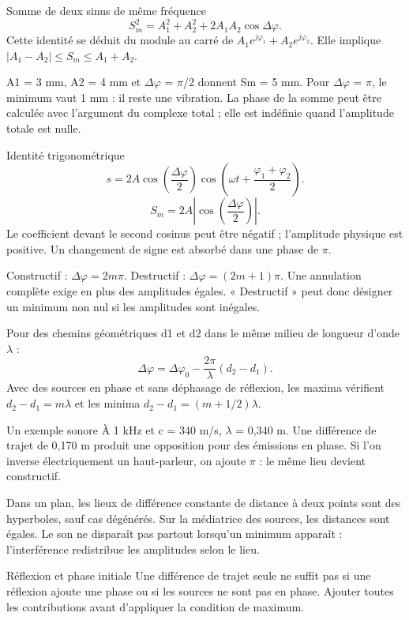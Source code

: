 \begin{loi}{Somme de deux sinus de même fréquence}
\[S_m^2=A_1^2+A_2^2+2A_1A_2\cos\Delta\varphi.\]Cette identité se déduit du module au carré de $A_1e^{j\varphi_1}+A_2e^{j\varphi_2}$. Elle implique $|A_1-A_2|\leq S_m\leq A_1+A_2$.
\end{loi}
A1 = 3 mm, A2 = 4 mm et \ensuremath{\Delta}\ensuremath{\varphi} = \ensuremath{\pi}/2 donnent Sm = 5 mm. Pour \ensuremath{\Delta}\ensuremath{\varphi} = \ensuremath{\pi}, le minimum vaut 1 mm : il reste une vibration. La phase de la somme peut être calculée avec l’argument du complexe total ; elle est indéfinie quand l’amplitude totale est nulle.


\begin{loi}{Identité trigonométrique}
\[s=2A\cos\left(\frac{\Delta\varphi}{2}\right)\cos\left(\omega t+\frac{\varphi_1+\varphi_2}{2}\right).\]\[S_m=2A\left|\cos\left(\frac{\Delta\varphi}{2}\right)\right|.\]Le coefficient devant le second cosinus peut être négatif ; l’amplitude physique est positive. Un changement de signe est absorbé dans une phase de \ensuremath{\pi}.
\end{loi}
Constructif : $\Delta\varphi=2m\pi$. Destructif : $\Delta\varphi=(2m+1)\pi$. Une annulation complète exige en plus des amplitudes égales. « Destructif » peut donc désigner un minimum non nul si les amplitudes sont inégales.


Pour des chemins géométriques d1 et d2 dans le même milieu de longueur d’onde \ensuremath{\lambda} :\[\Delta\varphi=\Delta\varphi_0-\frac{2\pi}{\lambda}(d_2-d_1).\]Avec des sources en phase et sans déphasage de réflexion, les maxima vérifient $d_2-d_1=m\lambda$ et les minima $d_2-d_1=(m+1/2)\lambda$.
\begin{methode}{Un exemple sonore}
À 1 kHz et c = 340 m/s, \ensuremath{\lambda} = 0,340 m. Une différence de trajet de 0,170 m produit une opposition pour des émissions en phase. Si l’on inverse électriquement un haut-parleur, on ajoute \ensuremath{\pi} : le même lieu devient constructif.
\end{methode}
Dans un plan, les lieux de différence constante de distance à deux points sont des hyperboles, sauf cas dégénérés. Sur la médiatrice des sources, les distances sont égales. Le son ne disparaît pas partout lorsqu’un minimum apparaît : l’interférence redistribue les amplitudes selon le lieu.
\begin{piege}{Réflexion et phase initiale}
Une différence de trajet seule ne suffit pas si une réflexion ajoute une phase ou si les sources ne sont pas en phase. Ajouter toutes les contributions avant d’appliquer la condition de maximum.
\end{piege}


